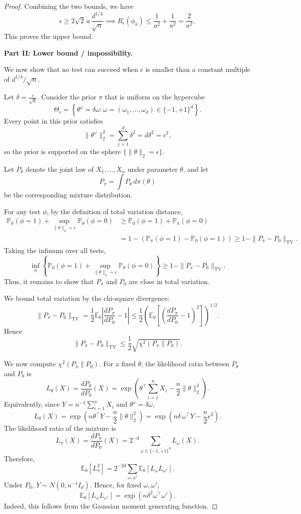 \begin{proof}
Combining the two bounds, we have
\[
\epsilon
\ge
2\sqrt2\,a\,\frac{d^{1/4}}{\sqrt n} \implies R_\epsilon(\phi_a)
\le
\frac1{a^2}+\frac1{a^2}
=
\frac2{a^2},
\]
This proves the upper bound.

\medskip

\noindent\textbf{Part II: Lower bound / impossibility.}

We now show that no test can succeed when $\epsilon$ is smaller than a constant multiple of $d^{1/4}/\sqrt n$.

Let \(
\delta=\frac{\epsilon}{\sqrt d}.
\)
Consider the prior $\pi$ that is uniform on the hypercube
\[
\Theta_\epsilon
=
\left\{
\theta^\omega=\delta \omega:
\omega=(\omega_1,\dots,\omega_d)\in\{-1,+1\}^d
\right\}.
\]
Every point in this prior satisfies
\[
\|\theta^\omega\|_2^2
=
\sum_{j=1}^d \delta^2
=
d\delta^2
=
\epsilon^2,
\]
so the prior is supported on the sphere $\{\|\theta\|_2=\epsilon\}$.

Let $P_\theta$ denote the joint law of $X_1,\dots,X_n$ under parameter $\theta$, and let
\[
P_\pi=\int P_\theta\,d\pi(\theta)
\]
be the corresponding mixture distribution.

For any test $\phi$, by the definition of total variation distance,
\begin{align*}
\mathbb P_0(\phi=1)
+
\sup_{\|\theta\|_2=\epsilon}\mathbb P_\theta(\phi=0)
&\ge
\mathbb P_0(\phi=1)
+
\mathbb P_\pi(\phi=0)\\
&=
1-\left(\mathbb P_\pi(\phi=1)-\mathbb P_0(\phi=1)\right)\ge
1-\|P_\pi-P_0\|_{\mathrm{TV}}.
\end{align*}
Taking the infimum over all tests,
\[
\inf_\phi
\left\{
\mathbb P_0(\phi=1)
+
\sup_{\|\theta\|_2=\epsilon}\mathbb P_\theta(\phi=0)
\right\}
\ge
1-\|P_\pi-P_0\|_{\mathrm{TV}}.
\]
Thus, it remains to show that $P_\pi$ and $P_0$ are close in total variation.

We bound total variation by the chi-square divergence:
\[
\|P_\pi-P_0\|_{\mathrm{TV}}
=
\frac12\mathbb E_0\left|\frac{dP_\pi}{dP_0}-1\right|
\le
\frac12
\left(
\mathbb E_0\left[
\left(\frac{dP_\pi}{dP_0}-1\right)^2
\right]
\right)^{1/2}.
\]
Hence
\[
\|P_\pi-P_0\|_{\mathrm{TV}}
\le
\frac12\sqrt{\chi^2(P_\pi\|P_0)}.
\]

We now compute $\chi^2(P_\pi\|P_0)$. For a fixed $\theta$, the likelihood ratio between $P_\theta$ and $P_0$ is
\[
L_\theta(X)
=
\frac{dP_\theta}{dP_0}(X)
=
\exp\left(
\theta^\top\sum_{i=1}^n X_i
-
\frac n2\|\theta\|_2^2
\right).
\]
Equivalently, since $Y=n^{-1}\sum_{i=1}^n X_i$ and $\theta^\omega=\delta\omega$,
\[
L_\theta(X)
=
\exp\left(
n\theta^\top Y
-
\frac n2\|\theta\|_2^2
\right)=
\exp\left(
n\delta\,\omega^\top Y
-
\frac n2\epsilon^2
\right).
\]
The likelihood ratio of the mixture is
\[
L_\pi(X)
=
\frac{dP_\pi}{dP_0}(X)
=
2^{-d}\sum_{\omega\in\{-1,+1\}^d} L_\omega(X).
\]
Therefore,
\[
\mathbb E_0[L_\pi^2]
=
2^{-2d}
\sum_{\omega,\omega'}
\mathbb E_0[L_\omega L_{\omega'}].
\]
Under $P_0$, $Y\sim N(0,n^{-1}I_d)$. Hence, for fixed $\omega,\omega'$,
\[
\mathbb E_0[L_\omega L_{\omega'}]
=
\exp\left(
n\delta^2 \omega^\top\omega'
\right).
\]
Indeed, this follows from the Gaussian moment generating function.


\end{proof}
